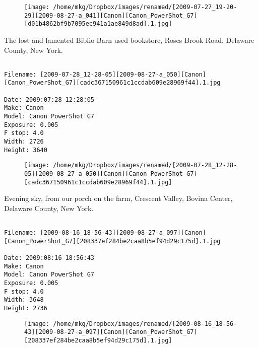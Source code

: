\begin{figure}
\texttt{[image: /home/mkg/Dropbox/images/renamed/[2009-07-27\_19-20-29][2009-08-27-a\_041][Canon][Canon\_PowerShot\_G7][d01b4862bf9b7095ec941a1ae849d8ad].1.jpg]}
\end{figure}
    
\clearpage
\onecolumn
\noindent The lost and lamented Biblio Barn used bookstore, Roses Brook Road, Delaware County, New York.
\noindent
\begin{lstlisting}

Filename: [2009-07-28_12-28-05][2009-08-27-a_050][Canon][Canon_PowerShot_G7][cadc367150961c1ccdab609e28969f44].1.jpg

Date: 2009:07:28 12:28:05
Make: Canon
Model: Canon PowerShot G7
Exposure: 0.005
F stop: 4.0
Width: 2726
Height: 3640
\end{lstlisting}
\clearpage

\begin{figure}
\texttt{[image: /home/mkg/Dropbox/images/renamed/[2009-07-28\_12-28-05][2009-08-27-a\_050][Canon][Canon\_PowerShot\_G7][cadc367150961c1ccdab609e28969f44].1.jpg]}
\end{figure}
    
\clearpage
\onecolumn
\noindent Evening sky, from our porch on the farm, Crescent Valley, Bovina Center, Delaware County, New York.
\noindent
\begin{lstlisting}

Filename: [2009-08-16_18-56-43][2009-08-27-a_097][Canon][Canon_PowerShot_G7][208337ef284be2caa8b5ef94d29c175d].1.jpg

Date: 2009:08:16 18:56:43
Make: Canon
Model: Canon PowerShot G7
Exposure: 0.005
F stop: 4.0
Width: 3648
Height: 2736
\end{lstlisting}
\clearpage

\begin{figure}
\texttt{[image: /home/mkg/Dropbox/images/renamed/[2009-08-16\_18-56-43][2009-08-27-a\_097][Canon][Canon\_PowerShot\_G7][208337ef284be2caa8b5ef94d29c175d].1.jpg]}
\end{figure}
    
